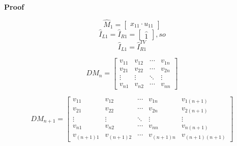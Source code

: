 \documentclass[10pt,letterpaper]{article}
\newenvironment{proof}{\noindent\textbf{Proof} }{\qed \newline}
\newcommand{\qed}{\nobreak \ifvmode \relax \else
      \ifdim\lastskip<1.5em \hskip-\lastskip
      \hskip1.5em plus0em minus0.5em \fi \nobreak
      \vrule height0.75em width0.5em depth0.25em\fi}
\numberwithin{equation}{section}
\begin{document}
\begin{proof}

\[ \hat M_1 = \left[ \begin{matrix} x_{11} \cdot u_{11} \end{matrix} \right] \]
\[ \hat I_{L1} = \hat I_{R1} = \left[ \begin{matrix}
 \hat 1
\end{matrix} \right], so \]
\[ \hat I_{L1} = \hat I_{R1}^{TV} \]

\[ DM_n = \left[ \begin{matrix} 
  v_{11} & v_{12} & \cdots & v_{1n} \\
  v_{21} & v_{22} & \cdots & v_{2n} \\
  \vdots & \vdots & \ddots & \vdots \\
  v_{n1} & v_{n2} & \cdots & v_{nn}
\end{matrix} \right] \]

\[ DM_{n+1} = \left[ \begin{matrix} 
  v_{11} & v_{12} & \cdots & v_{1n} & v_{1(n+1)} \\
  v_{21} & v_{22} & \cdots & v_{2n} & v_{2(n+1)} \\
  \vdots & \vdots & \ddots & \vdots & \vdots \\
  v_{n1} & v_{n2} & \cdots & v_{nn} & v_{n(n+1)} \\
  v_{(n+1)1} & v_{(n+1)2} & \cdots & v_{(n+1)n} & v_{(n+1)(n+1)}
\end{matrix} \right] \]  \end{proof}
\end{document}
